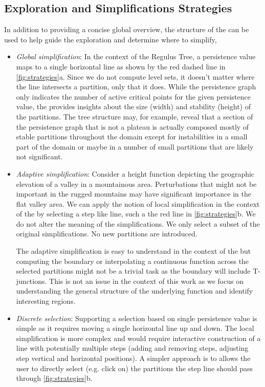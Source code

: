 \subsection{Exploration and Simplifications Strategies}
\label{sec:simplification}

In addition to providing a concise global overview, the structure of the \RT can be used to help guide the exploration and determine where to simplify, 
\begin{itemize}[label={}, leftmargin=0pt, noitemsep]
    \item  \textit{Global simplification}: In the context of the Regulus Tree, a persistence value maps to a single horizontal line as shown by the red dashed line in \autoref{fig:strategies}a. Since we do not compute level sets, it doesn't matter where the line intersects a partition, only that it does.  While the persistence graph only indicates the number of active critical points for the given persistence value, the \RT provides insights about the size (width) and stability (height) of the partitions. The tree structure may, for example, reveal  that a section of the persistence graph that is not a plateau is actually composed mostly of stable partitions throughout the domain except for instabilities in a small part of the domain or maybe in a number of small partitions that are likely not significant.

    \item  \textit{Adaptive simplification}: Consider a height function depicting the geographic elevation of a valley in a mountainous area. Perturbations that might not be important in the rugged mountains may have significant importance in the flat valley area. We can apply the notion of local simplification in the context of the \RT by selecting a step like line, such a the red line in \autoref{fig:strategies}b. We do not alter the meaning of the simplifications. We only select a subset of the original simplifications. No new partitions are introduced.
    
    The adaptive simplification is easy to understand in the context of the \RT but computing the boundary or interpolating a continuous function across the selected partitions might not be a trivial task as the boundary will include T-junctions. This is not an issue in the context of this work as we focus on understanding the general structure of the underlying function and identify interesting regions.
    
    \item  \textit{Discrete selection}: Supporting a selection based on single persistence value is simple as it requires moving a single horizontal line up and down. The local simplification is more complex and would require interactive construction of a line with potentially multiple steps (adding and removing steps, adjusting step vertical and horizontal positions). A simpler approach is to allows the user to directly select (e.g. click on) the partitions the step line should pass through \autoref{fig:strategies}b.
    

\end{itemize}
